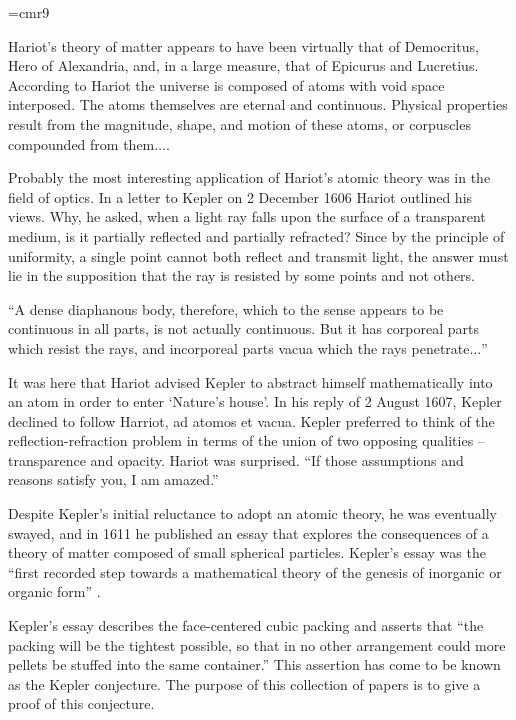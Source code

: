 {
\narrower
\font\ninerm=cmr9
\ninerm

    Hariot's theory of matter appears to have been virtually that of Democritus, Hero of Alexandria, and, in a large measure, that of Epicurus
    and Lucretius. According to Hariot the universe is composed of atoms with void space interposed. The atoms themselves are eternal and
    continuous. Physical properties result from the magnitude, shape, and motion of these atoms, or corpuscles compounded from them$\ldots$.

    Probably the most interesting application of Hariot's atomic theory was in the field of optics. In a letter to Kepler on 2 December 1606
    Hariot outlined his views. Why, he asked, when a light ray falls upon the surface of a transparent medium, is it partially reflected and
    partially refracted? Since by the principle of uniformity, a single point cannot both reflect and transmit light, the answer must lie in the
    supposition that the ray is resisted by some points and not others.

    ``A dense diaphanous body, therefore, which to the sense appears to be continuous in all parts, is not actually continuous. But it has
    corporeal parts which resist the rays, and incorporeal parts vacua which the rays penetrate$\ldots$''

    It was here that Hariot advised Kepler to abstract himself mathematically into an atom in order to enter `Nature's house'. In his reply of 2
    August 1607, Kepler declined to follow Harriot, ad atomos et vacua. Kepler preferred to think of the reflection-refraction problem in terms
    of the union of two opposing qualities --
    transparence and opacity. Hariot was surprised. ``If those assumptions and reasons satisfy you, I
    am amazed.'' \cite[p.26]{Kar66}

}

\smallskip
Despite Kepler's initial reluctance to adopt an atomic theory, he
was eventually swayed, and in 1611 he published an essay that
explores the consequences of a theory of matter composed of small
spherical particles.  Kepler's essay was the ``first recorded step
towards a mathematical theory of the genesis of inorganic or
organic form'' \cite[p.v]{Why66}.

Kepler's essay describes
the face-centered cubic packing and asserts that ``the packing will
be the tightest possible, so that in no other arrangement  could more
pellets be stuffed into the same container.''  This assertion has
come to be known as the Kepler conjecture.   The purpose of this
collection of papers is to give a proof of this conjecture.

